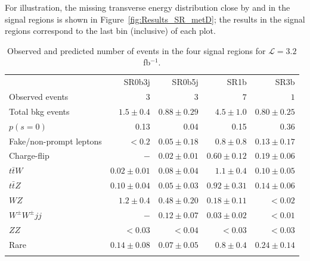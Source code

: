 \documentclass[UKenglish,texlive=2013]{\ATLASLATEXPATH atlasdoc}
\begin{document}
For illustration, the missing transverse energy distribution close by and in the signal regions is shown in Figure~\ref{fig:Results_SR_metD}; 
the results in the signal regions correspond to the last bin (inclusive) of each plot. 
 
\begin{table}[t!]
\begin{center}
\setlength{\tabcolsep}{0.0pc}
{\small
\begin{tabular*}{\textwidth}{@{\extracolsep{\fill}}lrrrr}
\noalign{\smallskip}\hline\noalign{\smallskip}
         & SR0b3j         & SR0b5j     & SR1b & SR3b     \\[-0.05cm]
\noalign{\smallskip}\hline\noalign{\smallskip}
Observed events         & $3$       &  $3$   & $7$  & $1$             \\
\noalign{\smallskip}\hline\noalign{\smallskip}
Total bkg events & $1.5 \pm 0.4$ & $0.88 \pm 0.29$ & $4.5 \pm 1.0$ & $0.80 \pm 0.25$\\
$p(s = 0)$                &  0.13  &  0.04  &  0.15  &   0.36   \\
\noalign{\smallskip}\hline\noalign{\smallskip}
Fake/non-prompt leptons & $<0.2$ & $0.05\pm 0.18$ & $0.8 \pm 0.8$ & $0.13 \pm 0.17$\\ %
Charge-flip & $-$ & $0.02 \pm 0.01$ & $0.60 \pm 0.12$ & $0.19 \pm 0.06$\\ %
$t\bar{t}W$ & $0.02 \pm 0.01$ & $0.08 \pm 0.04$ & $1.1 \pm 0.4$ & $0.10 \pm 0.05$\\
$t\bar{t}Z$ & $0.10 \pm 0.04$ & $0.05 \pm 0.03$ & $0.92 \pm 0.31$ & $0.14 \pm 0.06$\\ %
$WZ$ & $1.2 \pm 0.4$ & $0.48 \pm 0.20$ & $0.18 \pm 0.11$ & $<0.02$\\
$W^\pm W^\pm jj$ & $-$ & $0.12 \pm 0.07$ & $0.03 \pm 0.02$ & $<0.01$\\
$ZZ$ & $<0.03$ & $<0.04$ & $<0.03$ & $<0.03$\\
Rare & $0.14 \pm 0.08$ & $0.07 \pm 0.05$ & $0.8 \pm 0.4$ & $0.24 \pm 0.14$\\
\noalign{\smallskip}\hline\noalign{\smallskip}
\end{tabular*}
}

\end{center}
\caption{Observed and predicted number of events in the four signal regions for $\mathcal L=3.2 $fb$^{-1}$. }
\label{tab:sr_yields}
\end{table}
\end{document}
